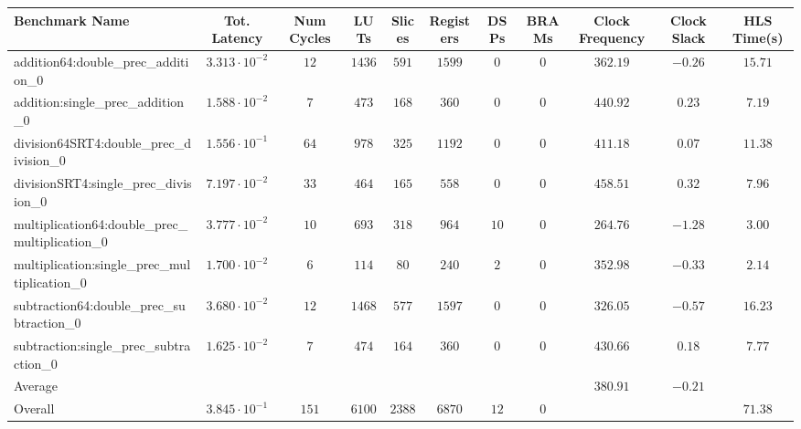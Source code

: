 \begin{tabular}{|l|c|c|c|c|c|c|c|c|c|c|}
\hline
Benchmark Name                                   & Tot. Latency            & Num Cycles & LUTs     & Slices   & Registers & DSPs   & BRAMs & Clock Frequency & Clock Slack & HLS Time(s) \\
\hline
addition64:double\_prec\_addition\_0             & $ 3.313 \cdot 10^{-2} $ & $ 12     $ & $ 1436 $ & $ 591  $ & $ 1599  $ & $ 0  $ & $ 0 $ & $ 362.19      $ & $ -0.26   $ & $ 15.71   $ \\
addition:single\_prec\_addition\_0               & $ 1.588 \cdot 10^{-2} $ & $ 7      $ & $ 473  $ & $ 168  $ & $ 360   $ & $ 0  $ & $ 0 $ & $ 440.92      $ & $ 0.23    $ & $ 7.19    $ \\
division64SRT4:double\_prec\_division\_0         & $ 1.556 \cdot 10^{-1} $ & $ 64     $ & $ 978  $ & $ 325  $ & $ 1192  $ & $ 0  $ & $ 0 $ & $ 411.18      $ & $ 0.07    $ & $ 11.38   $ \\
divisionSRT4:single\_prec\_division\_0           & $ 7.197 \cdot 10^{-2} $ & $ 33     $ & $ 464  $ & $ 165  $ & $ 558   $ & $ 0  $ & $ 0 $ & $ 458.51      $ & $ 0.32    $ & $ 7.96    $ \\
multiplication64:double\_prec\_multiplication\_0 & $ 3.777 \cdot 10^{-2} $ & $ 10     $ & $ 693  $ & $ 318  $ & $ 964   $ & $ 10 $ & $ 0 $ & $ 264.76      $ & $ -1.28   $ & $ 3.00    $ \\
multiplication:single\_prec\_multiplication\_0   & $ 1.700 \cdot 10^{-2} $ & $ 6      $ & $ 114  $ & $ 80   $ & $ 240   $ & $ 2  $ & $ 0 $ & $ 352.98      $ & $ -0.33   $ & $ 2.14    $ \\
subtraction64:double\_prec\_subtraction\_0       & $ 3.680 \cdot 10^{-2} $ & $ 12     $ & $ 1468 $ & $ 577  $ & $ 1597  $ & $ 0  $ & $ 0 $ & $ 326.05      $ & $ -0.57   $ & $ 16.23   $ \\
subtraction:single\_prec\_subtraction\_0         & $ 1.625 \cdot 10^{-2} $ & $ 7      $ & $ 474  $ & $ 164  $ & $ 360   $ & $ 0  $ & $ 0 $ & $ 430.66      $ & $ 0.18    $ & $ 7.77    $ \\
\hline
Average                                          & $                     $ & $        $ & $      $ & $      $ & $       $ & $    $ & $   $ & $ 380.91      $ & $ -0.21   $ & $         $ \\
\hline
Overall                                          & $ 3.845 \cdot 10^{-1} $ & $ 151    $ & $ 6100 $ & $ 2388 $ & $ 6870  $ & $ 12 $ & $ 0 $ & $             $ & $         $ & $ 71.38   $ \\
\hline
\end{tabular}
